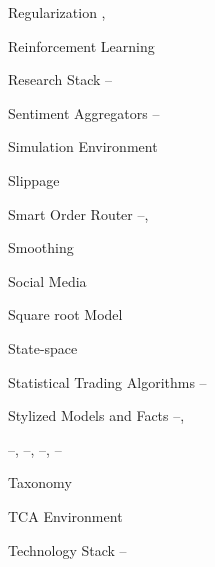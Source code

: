 \begin{multicols}{2}
{Regularization \hfill \pageref{in:regz1}, \pageref{in:regz2} \par

Reinforcement Learning \hfill \pageref{in:re_learning} \par

Research Stack \hfill \pageref{in:research_stack1}--\pageref{in:research_stack2} \pspace





Sentiment Aggregators \hfill \pageref{in:sentag1}--\pageref{in:sentag2} \par

Simulation Environment \hfill \pageref{in:sim_environ} \par

Slippage \hfill \pageref{in:slippage} \par

Smart Order Router \hfill \pageref{in:sor1}--\pageref{in:sor2}, \pageref{in:sor3} \par

Smoothing \hfill \pageref{in:smoothing} \par

Social Media \hfill \pageref{in:social} \par

Square root Model \hfill \pageref{in:sqmodel} \par

State-space \hfill \pageref{in:state_space} \par

Statistical Trading Algorithms \hfill \pageref{in:sta1}--\pageref{in:sta2} \par

Stylized Models and Facts \hfill \pageref{in:style1}--\pageref{in:style2}, \par \hfill \pageref{in:style3}--\pageref{in:style4}, \pageref{in:style5}--\pageref{in:style6}, \pageref{in:style7}--\pageref{in:style8}, \pageref{in:style9}--\pageref{in:style10} \pspace





Taxonomy \hfill \pageref{in:taxonomy} \par

TCA Environment \hfill \pageref{in:tca_environ} \par

Technology Stack \hfill \pageref{in:tech_stack1}--\pageref{in:tech_stack2} \par

}
\end{multicols}

